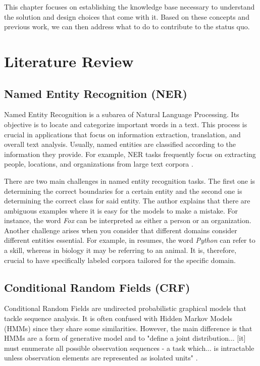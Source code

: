 \label{Cap2}


This chapter focuses on establishing the knowledge base necessary to understand
the solution and design choices that come with it. Based on these concepts and
previous work, we can then address what to do to contribute to the status quo.

\section{Literature Review}
  \subsection{Named Entity Recognition (NER)}
  Named Entity Recognition is a subarea of Natural Language Processing. Its
  objective is to locate and categorize important words in a text. This process
  is crucial in applications that focus on information extraction, translation,
  and overall text analysis. Usually, named entities are classified according
  to the information they provide. For example, NER tasks frequently focus on
  extracting people, locations, and organizations from large text corpora
  \cite{Mohit2014}.

  There are two main challenges in named entity recognition tasks. The first
  one is determining the correct boundaries for a certain entity and the second
  one is determining the correct class for said entity. The author explains
  that there are ambiguous examples where it is easy for the models to make a
  mistake. For instance, the word \textit{Fox} can be interpreted as either a
  person or an organization. Another challenge arises when you consider that
  different domains consider different entities essential. For example, in
  resumes, the word \textit{Python} can refer to a skill, whereas in biology it
  may be referring to an animal. It is, therefore, crucial to have specifically
  labeled corpora tailored for the specific domain. \cite{Mohit2014}

  \subsection{Conditional Random Fields (CRF)}
  Conditional Random Fields are undirected probabilistic graphical models
  that tackle sequence analysis. It is often confused with Hidden Markov Models
  (HMMs) since they share some similarities. However, the main difference is
  that HMMs are a form of generative model and to "define a joint
  distribution... [it] must enumerate all possible observation sequences
  - a task which... is intractable unless observation elements are
  represented as isolated units" \cite{Wallach2004}.

